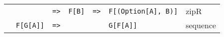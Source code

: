 \documentclass{tufte-handout}
\newcommand{\fb}{F[B]}
\newcommand{\rarr}{\texttt{=>}}
\newcommand{\fTwo}[2]{\texttt{#1} & \rarr & & & \texttt{#2}}
\newcommand{\fThree}[3]{\texttt{#1} & \rarr & \texttt{#2} & \rarr & \texttt{#3}}
\begin{document}
\begin{table}[ht]
\begin{tabular}{rrcclll}
      & \fThree{}{\fb}{F[(Option[A], B)]} & zipR \\
      & \fTwo{F[G[A]]}{G[F[A]]} & sequence \\
  \end{tabular}
\end{table}
\end{document}
